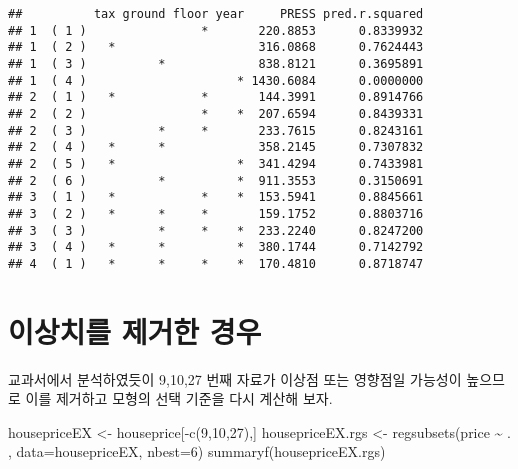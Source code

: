 \documentclass[
]{book}
\newenvironment{Shaded}{\begin{snugshade}}{\end{snugshade}}
\newcommand{\AttributeTok}[1]{\textcolor[rgb]{0.77,0.63,0.00}{#1}}
\newcommand{\DecValTok}[1]{\textcolor[rgb]{0.00,0.00,0.81}{#1}}
\newcommand{\FunctionTok}[1]{\textcolor[rgb]{0.00,0.00,0.00}{#1}}
\newcommand{\NormalTok}[1]{#1}
\newcommand{\OtherTok}[1]{\textcolor[rgb]{0.56,0.35,0.01}{#1}}
\newcommand{\SpecialCharTok}[1]{\textcolor[rgb]{0.00,0.00,0.00}{#1}}
\begin{document}
\begin{verbatim}
##          tax ground floor year     PRESS pred.r.squared
## 1  ( 1 )                *       220.8853      0.8339932
## 1  ( 2 )   *                    316.0868      0.7624443
## 1  ( 3 )          *             838.8121      0.3695891
## 1  ( 4 )                     * 1430.6084      0.0000000
## 2  ( 1 )   *            *       144.3991      0.8914766
## 2  ( 2 )                *    *  207.6594      0.8439331
## 2  ( 3 )          *     *       233.7615      0.8243161
## 2  ( 4 )   *      *             358.2145      0.7307832
## 2  ( 5 )   *                 *  341.4294      0.7433981
## 2  ( 6 )          *          *  911.3553      0.3150691
## 3  ( 1 )   *            *    *  153.5941      0.8845661
## 3  ( 2 )   *      *     *       159.1752      0.8803716
## 3  ( 3 )          *     *    *  233.2240      0.8247200
## 3  ( 4 )   *      *          *  380.1744      0.7142792
## 4  ( 1 )   *      *     *    *  170.4810      0.8718747
\end{verbatim}

\hypertarget{uxc774uxc0c1uxce58uxb97c-uxc81cuxac70uxd55c-uxacbduxc6b0}{%
\section{이상치를 제거한 경우}\label{uxc774uxc0c1uxce58uxb97c-uxc81cuxac70uxd55c-uxacbduxc6b0}}

교과서에서 분석하였듯이 9,10,27 번째 자료가 이상점 또는 영향점일 가능성이 높으므로 이를 제거하고 모형의 선택 기준을 다시 계산해 보자.

\begin{Shaded}
\begin{Highlighting}[]
\NormalTok{housepriceEX }\OtherTok{\textless{}{-}}\NormalTok{ houseprice[}\SpecialCharTok{{-}}\FunctionTok{c}\NormalTok{(}\DecValTok{9}\NormalTok{,}\DecValTok{10}\NormalTok{,}\DecValTok{27}\NormalTok{),]}
\NormalTok{housepriceEX.rgs }\OtherTok{\textless{}{-}} \FunctionTok{regsubsets}\NormalTok{(price }\SpecialCharTok{\textasciitilde{}}\NormalTok{ . , }\AttributeTok{data=}\NormalTok{housepriceEX, }\AttributeTok{nbest=}\DecValTok{6}\NormalTok{)}
\FunctionTok{summaryf}\NormalTok{(housepriceEX.rgs)}
\end{Highlighting}
\end{Shaded}
\end{document}

